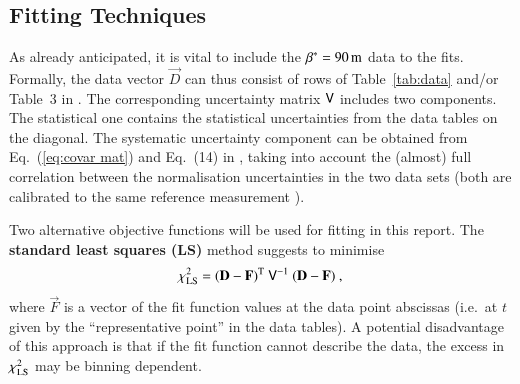 \subsection{Fitting Techniques}
\label{sec:cni fit techniques}

As already anticipated, it is vital to include the $\beta^* = 90\,{\rm m}$ data to the fits. Formally, the data vector $\vec D$ can thus consist of rows of Table~\ref{tab:data} and/or Table~3 in \cite{8tev-90m}. The corresponding uncertainty matrix $\mathsf{V}$ includes two components. The statistical one contains the statistical uncertainties from the data tables on the diagonal. The systematic uncertainty component can be obtained from Eq.~(\ref{eq:covar mat}) and Eq.~(14) in \cite{8tev-90m}, taking into account the (almost) full correlation between the normalisation uncertainties in the two data sets (both are calibrated to the same reference measurement \cite{prl111}).



Two alternative objective functions will be used for fitting in this report. The {\bf standard least squares (LS)} method suggests to minimise
\begin{equation}
\label{eq:chi sq LS}
	\chi_{\rm LS}^2 = (\mathbf{D} - \mathbf{F})^{\rm T}\ \mathsf{V}^{-1}\ (\mathbf{D} - \mathbf{F})\ ,
\end{equation}
where $\vec F$ is a vector of the fit function values at the data point abscissas (i.e.~at $t$ given by the ``representative point'' in the data tables). A potential disadvantage of this approach is that if the fit function cannot describe the data, the excess in $\chi^2_{\rm LS}$ may be binning dependent.


